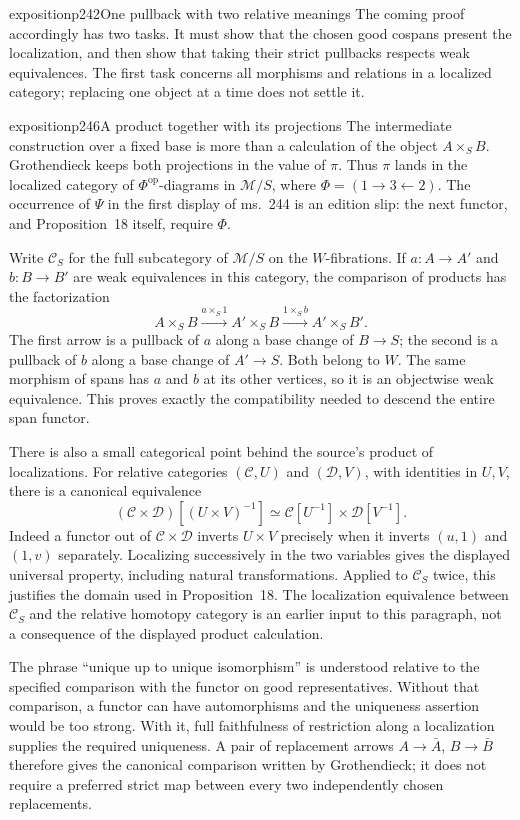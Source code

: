 \begin{dcomment}{exposition}{p242}{One pullback with two relative meanings}
The coming proof accordingly has two tasks. It must show that the chosen good cospans present the localization, and then show that taking their strict pullbacks respects weak equivalences. The first task concerns all morphisms and relations in a localized category; replacing one object at a time does not settle it.
\end{dcomment}

\begin{dcomment}{exposition}{p246}{A product together with its projections}
The intermediate construction over a fixed base is more than a calculation of the object $A\times_S B$. Grothendieck keeps both projections in the value of $\pi$. Thus $\pi$ lands in the localized category of $\Phi^{\mathrm{op}}$-diagrams in $\mathcal M/S$, where $\Phi=(1\to3\leftarrow2)$. The occurrence of $\Psi$ in the first display of ms.~244 is an edition slip: the next functor, and Proposition~18 itself, require $\Phi$.

Write $\mathcal C_S$ for the full subcategory of $\mathcal M/S$ on the $W$-fibrations. If $a:A\to A'$ and $b:B\to B'$ are weak equivalences in this category, the comparison of products has the factorization
\[
 A\times_S B\xrightarrow{a\times_S1}
 A'\times_S B\xrightarrow{1\times_S b}
 A'\times_S B'.
\]
The first arrow is a pullback of $a$ along a base change of $B\to S$; the second is a pullback of $b$ along a base change of $A'\to S$. Both belong to $W$. The same morphism of spans has $a$ and $b$ at its other vertices, so it is an objectwise weak equivalence. This proves exactly the compatibility needed to descend the entire span functor.

There is also a small categorical point behind the source's product of localizations. For relative categories $(\mathcal C,U)$ and $(\mathcal D,V)$, with identities in $U,V$, there is a canonical equivalence
\[
 (\mathcal C\times\mathcal D)[(U\times V)^{-1}]
 \simeq\mathcal C[U^{-1}]\times\mathcal D[V^{-1}].
\]
Indeed a functor out of $\mathcal C\times\mathcal D$ inverts $U\times V$ precisely when it inverts $(u,1)$ and $(1,v)$ separately. Localizing successively in the two variables gives the displayed universal property, including natural transformations. Applied to $\mathcal C_S$ twice, this justifies the domain used in Proposition~18. The localization equivalence between $\mathcal C_S$ and the relative homotopy category is an earlier input to this paragraph, not a consequence of the displayed product calculation.

The phrase ``unique up to unique isomorphism'' is understood relative to the specified comparison with the functor on good representatives. Without that comparison, a functor can have automorphisms and the uniqueness assertion would be too strong. With it, full faithfulness of restriction along a localization supplies the required uniqueness. A pair of replacement arrows $A\to\bar A$, $B\to\bar B$ therefore gives the canonical comparison written by Grothendieck; it does not require a preferred strict map between every two independently chosen replacements.


\end{dcomment}
